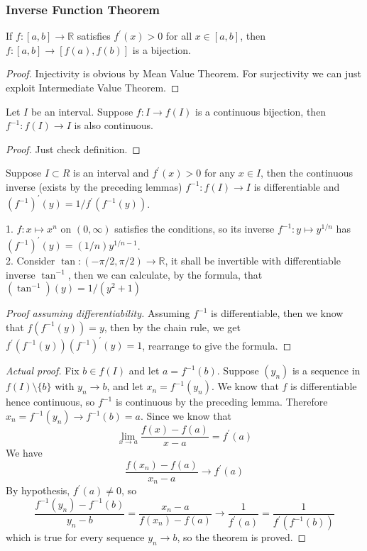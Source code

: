\subsubsection{Inverse Function Theorem}
\begin{lemma}
    If $f:[a,b]\to\mathbb R$ satisfies $f^\prime(x)>0$ for all $x\in [a,b]$, then $f:[a,b]\to[f(a),f(b)]$ is a bijection.
\end{lemma}
\begin{proof}
    Injectivity is obvious by Mean Value Theorem.
    For surjectivity we can just exploit Intermediate Value Theorem.
\end{proof}
\begin{lemma}
    Let $I$ be an interval.
    Suppose $f:I\to f(I)$ is a continuous bijection, then $f^{-1}:f(I)\to I$ is also continuous.
\end{lemma}
\begin{proof}
    Just check definition.
\end{proof}
\begin{theorem}
    Suppose $I\subset R$ is an interval and $f^\prime(x)>0$ for any $x\in I$, then the continuous inverse (exists by the preceding lemmas) $f^{-1}:f(I)\to I$ is differentiable and $(f^{-1})^\prime(y)=1/f^\prime(f^{-1}(y))$.
\end{theorem}
\begin{example}
    1. $f:x\mapsto x^n$ on $(0,\infty)$ satisfies the conditions, so its inverse $f^{-1}:y\mapsto y^{1/n}$ has $(f^{-1})^\prime(y)=(1/n)y^{1/n-1}$.\\
    2. Consider $\tan:(-\pi/2,\pi/2)\to\mathbb R$, it shall be invertible with differentiable inverse $\tan^{-1}$, then we can calculate, by the formula, that $(\tan^{-1})(y)=1/(y^2+1)$
\end{example}
\begin{proof}[Proof assuming differentiability]
    Assuming $f^{-1}$ is differentiable, then we know that $f(f^{-1}(y))=y$, then by the chain rule, we get $f^\prime(f^{-1}(y))(f^{-1})^\prime(y)=1$, rearrange to give the formula.
\end{proof}
\begin{proof}[Actual proof]
    Fix $b\in f(I)$ and let $a=f^{-1}(b)$.
    Suppose $(y_n)$ is a sequence in $f(I)\setminus \{b\}$ with $y_n\to b$, and let $x_n=f^{-1}(y_n)$.
    We know that $f$ is differentiable hence continuous, so $f^{-1}$ is continuous by the preceding lemma.
    Therefore $x_n=f^{-1}(y_n)\to f^{-1}(b)=a$.
    Since we know that
    $$\lim_{x\to a}\frac{f(x)-f(a)}{x-a}=f^\prime(a)$$
    We have
    $$\frac{f(x_n)-f(a)}{x_n-a}\to f^\prime(a)$$
    By hypothesis, $f^\prime(a)\neq 0$, so
    $$\frac{f^{-1}(y_n)-f^{-1}(b)}{y_n-b}=\frac{x_n-a}{f(x_n)-f(a)}\to\frac{1}{f^\prime(a)}=\frac{1}{f^\prime(f^{-1}(b))}$$
    which is true for every sequence $y_n\to b$, so the theorem is proved.
\end{proof}
